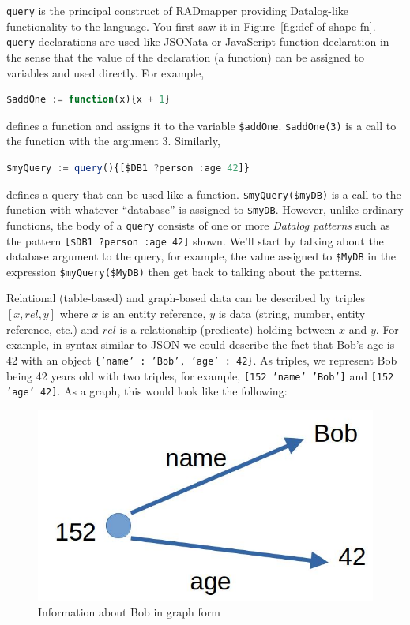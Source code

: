 \documentclass[10pt,letterpaper]{article} %
\newcommand{\stt}[1]{\texttt{#1}} %
\begin{document}
\stt{query} is the principal construct of RADmapper providing Datalog-like functionality to the language.
You first saw it in Figure~\ref{fig:def-of-shape-fn}.
\stt{query} declarations are used like JSONata or JavaScript function declaration in the sense that the value of the declaration (a function) can be assigned to variables and used directly.
For example,
\begin{lstlisting}[language=JavaScript,numbers=none,basicstyle=\ttfamily\scriptsize]
$addOne := function(x){x + 1}
\end{lstlisting} \vspace{-2em}
defines a function and assigns it to the variable \stt{\$addOne}.
\stt{\$addOne(3)} is a call to the function with the argument 3.
Similarly,
\begin{lstlisting}[language=JavaScript,numbers=none,basicstyle=\ttfamily\scriptsize]
$myQuery := query(){[$DB1 ?person :age 42]}
\end{lstlisting} \vspace{-2em}
defines a query that can be used like a function.
\stt{\$myQuery(\$myDB)} is a call to the function with whatever ``database'' is assigned to \stt{\$myDB}.
However, unlike ordinary functions, the body of a \stt{query} consists of one or more \textit{Datalog patterns} such as the pattern \stt{[\$DB1 ?person :age 42]} shown.
We'll start by talking about the database argument to the query, for example, the value assigned to \stt{\$MyDB} in the expression \stt{\$myQuery(\$MyDB)} then get back to talking about the patterns.

Relational (table-based) and graph-based data can be described by triples $[x,rel,y]$ where $x$ is an entity reference, $y$ is data (string, number, entity reference, etc.) and $rel$ is a relationship (predicate) holding between $x$ and $y$.
For example, in syntax similar to JSON we could describe the fact that Bob's age is 42 with an object \stt{\{'name' : 'Bob', 'age' : 42\}}.
As triples, we represent Bob being 42 years old with two triples, for example, \stt{[152 'name' 'Bob']} and \stt{[152 'age' 42]}.
As a graph, this would look like the following:

\begin{figure}[H]
  \caption{Information about Bob in graph form}
  \label{fig:bob-as-a-graph}
     \includegraphics[scale=0.15]{bob-age-42.jpg}
  \centering
\end{figure}
\end{document}
